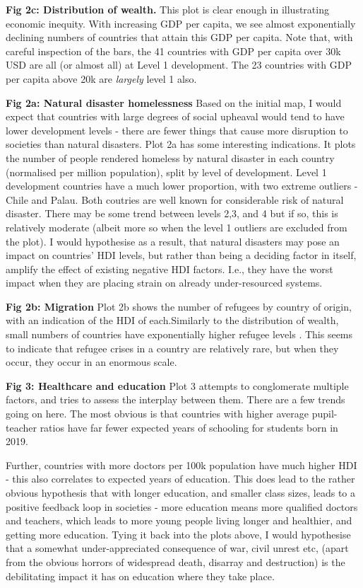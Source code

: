 \documentclass[ 10pt ]{fphw}
\begin{document}
\textbf{Fig 2c: Distribution of wealth.} This plot is clear enough in illustrating economic inequity. With increasing GDP per capita, we see almost exponentially declining numbers of countries that attain this GDP per capita. Note that, with careful inspection of the bars, the 41 countries with GDP per capita over 30k USD are all (or almost all) at Level 1 development. The 23 countries with GDP per capita above 20k are \textit{largely} level 1 also.

\textbf{Fig 2a: Natural disaster homelessness} Based on the initial map, I would expect that countries with large degrees of social upheaval would tend to have lower development levels - there are fewer things that cause more disruption to societies than natural disasters. Plot 2a has some interesting indications. It plots the number of people rendered homeless by natural disaster in each country (normalised per million population), split by level of development. Level 1 development countries have a much lower proportion, with two extreme outliers - Chile and Palau. Both coutries are well known for considerable risk of natural disaster. There may be some trend between levels 2,3, and 4 but if so, this is relatively moderate (albeit more so when the level 1 outliers are excluded from the plot). I would hypothesise as a result, that natural disasters may pose an impact on countries' HDI levels, but rather than being a deciding factor in itself, amplify the effect of existing negative HDI factors. I.e., they have the worst impact when they are placing strain on already under-resourced systems.

\textbf{Fig 2b: Migration} Plot 2b shows the number of refugees by country of origin, with an indication of the HDI of each.Similarly to the distribution of wealth, small numbers of countries have exponentially higher refugee levels . This seems to indicate that refugee crises in a country are relatively rare, but when they occur, they occur in an enormous scale.

\textbf{Fig 3: Healthcare and education} Plot 3 attempts to conglomerate multiple factors, and tries to assess the interplay between them. There are a few trends going on here. The most obvious is that countries with higher average pupil-teacher ratios have far fewer expected years of schooling for students born in 2019.

Further, countries with more doctors per 100k population have much higher HDI - this also correlates to expected years of education. This does lead to the rather obvious hypothesis that with longer education, and smaller class sizes, leads to a positive feedback loop in societies - more education means more qualified doctors and teachers, which leads to more young people living longer and healthier, and getting more education. Tying it back into the plots above, I would hypothesise that a somewhat under-appreciated consequence of war, civil unrest etc, (apart from the obvious horrors of widespread death, disarray and destruction) is the debilitating impact it has on education where they take place.
\end{document}
